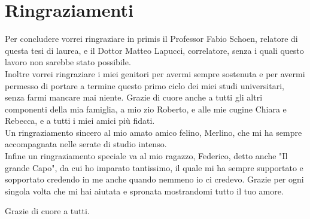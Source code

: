 \chapter*{Ringraziamenti}\label{ch:ringraziamenti}
Per concludere vorrei ringraziare in primis il Professor Fabio Schoen, relatore di questa tesi di laurea, e il Dottor Matteo Lapucci, correlatore, senza i quali questo lavoro non sarebbe stato possibile.\\

Inoltre vorrei ringraziare i miei genitori per avermi sempre sostenuta e per avermi permesso di portare a termine questo primo ciclo dei miei studi universitari, senza farmi mancare mai niente.
Grazie di cuore anche a tutti gli altri componenti della mia famiglia, a mio zio Roberto, e alle mie cugine Chiara e Rebecca, e a tutti i miei amici più fidati.\\

Un ringraziamento sincero al mio amato amico felino, Merlino, che mi ha sempre accompagnata nelle serate di studio intenso.\\

Infine un ringraziamento speciale va al mio ragazzo, Federico, detto anche "Il grande Capo", da cui ho imparato tantissimo, il quale mi ha sempre supportato e sopportato credendo in me anche quando nemmeno io ci credevo. Grazie per ogni singola volta che mi hai aiutata e spronata mostrandomi tutto il tuo amore.\\

\begin{center}
Grazie di cuore a tutti.
\end{center}